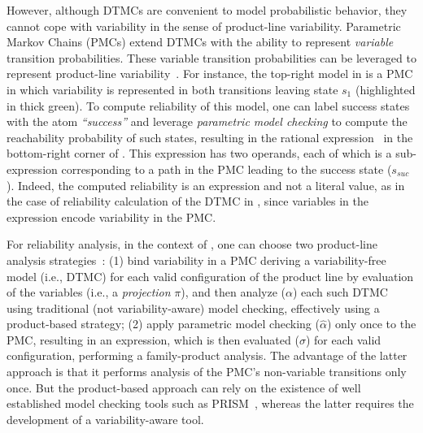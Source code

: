  However, although DTMCs are convenient to model probabilistic behavior, they cannot cope with variability in the sense of product-line variability.  Parametric Markov Chains (PMCs) extend DTMCs with the ability to represent \emph{variable} transition probabilities. These variable transition probabilities can be leveraged to represent product-line variability~\citep{FDTMC,Ghezzi2013,Profeat}. For instance, the top-right model in  is a PMC in which variability is represented in both transitions leaving state $s_1$ (highlighted in thick green). To compute reliability of this model, one can label success states with the atom \emph{``success''} and leverage \emph{parametric model checking} to compute  the reachability probability of such states,  %
 resulting in the rational expression~\cite{HahnHZ10} in the bottom-right corner of  . This expression has two operands, each of which is a sub-expression corresponding to a path in the PMC leading to the success state ($s_{\mathit{suc}}$). Indeed, the computed reliability is an expression and not a literal value, as in the case of reliability calculation of the DTMC in , since variables in the expression encode variability in the PMC.

For reliability analysis, in the context of , one can choose two product-line analysis strategies~\citep{FDTMC}: (1) bind variability in a PMC deriving a variability-free model (i.e., DTMC) for each valid configuration of the product line by evaluation of the variables (i.e., a \textit{projection} $\pi$), and then analyze ($\alpha$) each such DTMC using traditional (not variability-aware) model checking, effectively using a product-based  strategy; (2) apply parametric model checking ($\hat{\alpha}$) only once to the PMC, resulting in an expression, which is then evaluated ($\sigma$) for each valid configuration, performing a family-product analysis. The advantage of the 
latter approach is that it performs analysis of the PMC's non-variable transitions only once. But the product-based approach can rely on the existence of well established model checking tools such as PRISM~\citep{PRISM}, whereas the latter requires the development of a variability-aware tool.





